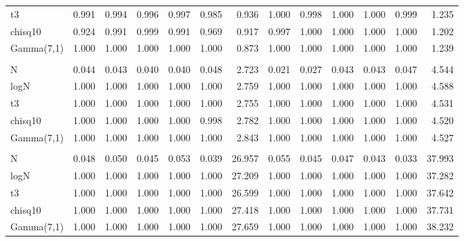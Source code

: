 \begin{table}[!h]
{\begin{tabular}[t]{lrrrrrrrrrrrr}
\hspace{1em}t3 & 0.991 & 0.994 & 0.996 & 0.997 & 0.985 & 0.936 & 1.000 & 0.998 & 1.000 & 1.000 & 0.999 & 1.235\\
\hspace{1em}chisq10 & 0.924 & 0.991 & 0.999 & 0.991 & 0.969 & 0.917 & 0.997 & 1.000 & 1.000 & 1.000 & 1.000 & 1.202\\
\hspace{1em}Gamma(7,1) & 1.000 & 1.000 & 1.000 & 1.000 & 1.000 & 0.873 & 1.000 & 1.000 & 1.000 & 1.000 & 1.000 & 1.239\\
\addlinespace[0.3em]
\multicolumn{13}{l}{\textbf{Random Projections}}\\
\hspace{1em}N & 0.044 & 0.043 & 0.040 & 0.040 & 0.048 & 2.723 & 0.021 & 0.027 & 0.043 & 0.043 & 0.047 & 4.544\\
\hspace{1em}logN & 1.000 & 1.000 & 1.000 & 1.000 & 1.000 & 2.759 & 1.000 & 1.000 & 1.000 & 1.000 & 1.000 & 4.588\\
\hspace{1em}t3 & 1.000 & 1.000 & 1.000 & 1.000 & 1.000 & 2.755 & 1.000 & 1.000 & 1.000 & 1.000 & 1.000 & 4.531\\
\hspace{1em}chisq10 & 1.000 & 1.000 & 1.000 & 1.000 & 0.998 & 2.782 & 1.000 & 1.000 & 1.000 & 1.000 & 1.000 & 4.520\\
\hspace{1em}Gamma(7,1) & 1.000 & 1.000 & 1.000 & 1.000 & 1.000 & 2.843 & 1.000 & 1.000 & 1.000 & 1.000 & 1.000 & 4.527\\
\addlinespace[0.3em]
\multicolumn{13}{l}{\textbf{Psaradakis and Vavra}}\\
\hspace{1em}N & 0.048 & 0.050 & 0.045 & 0.053 & 0.039 & 26.957 & 0.055 & 0.045 & 0.047 & 0.043 & 0.033 & 37.993\\
\hspace{1em}logN & 1.000 & 1.000 & 1.000 & 1.000 & 1.000 & 27.209 & 1.000 & 1.000 & 1.000 & 1.000 & 1.000 & 37.282\\
\hspace{1em}t3 & 1.000 & 1.000 & 1.000 & 1.000 & 1.000 & 26.599 & 1.000 & 1.000 & 1.000 & 1.000 & 1.000 & 37.642\\
\hspace{1em}chisq10 & 1.000 & 1.000 & 1.000 & 1.000 & 1.000 & 27.418 & 1.000 & 1.000 & 1.000 & 1.000 & 1.000 & 37.731\\
\hspace{1em}Gamma(7,1) & 1.000 & 1.000 & 1.000 & 1.000 & 1.000 & 27.659 & 1.000 & 1.000 & 1.000 & 1.000 & 1.000 & 38.232\\

\end{tabular}}
\end{table}
